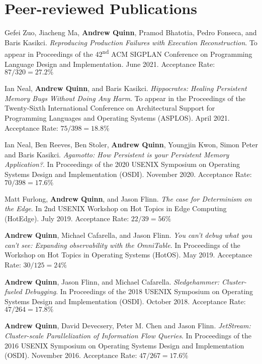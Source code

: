 \documentclass[letterpaper,10pt]{article}
\newcommand{\paper}[3]{#1. #2 #3}
\begin{document}
\section{Peer-reviewed Publications}
\begin{smenumerate}
  \item \paper{Gefei Zuo, Jiacheng Ma, \textbf{Andrew Quinn}, Pramod Bhatotia,
    Pedro Fonseca, and Baris Kasikci}{\emph{Reproducing Production Failures with
      Execution Reconstruction}. To appear in Proceedings of the
    42\textsuperscript{nd} ACM SIGPLAN Conference on Programming Language
    Design and Implementation. June 2021.}{Acceptance Rate: $87/320=27.2\%$}

  \item \paper{Ian Neal, \textbf{Andrew Quinn}, and Baris
    Kasikci}{\emph{Hippocrates: Healing Persistent Memory Bugs Without Doing Any
      Harm}. To appear in the Proceedings of the Twenty-Sixth International
    Conference on Architectural Support for Programming Languages and Operating
    Systems (ASPLOS). April 2021.}{Acceptance Rate: $75/398=18.8\%$}
    
\item \paper{Ian Neal, Ben Reeves, Ben Stoler, \textbf{Andrew Quinn}, Youngjin Kwon,
  Simon Peter and Baris Kasikci}{\emph{Agamotto: How Persistent is your
    Persistent Memory Application?}.  In Proceedings of the 2020 USENIX
  Symposium on Operating Systems Design and Implementation (OSDI).  November
  2020.}{Acceptance Rate: $70/398=17.6\%$}

\item \paper{Matt Furlong, \textbf{Andrew Quinn}, and Jason Flinn}
      {\emph{The case for Determinism on the Edge}.  In 2nd USENIX
        Workshop on Hot Topics in Edge Computing (HotEdge).  July
        2019.}{Acceptance Rate: $22/39=56\%$}

\item \paper{\textbf{Andrew Quinn}, Michael Cafarella, and Jason
  Flinn}{\emph{You can't debug what you can't see: Expanding
    observability with the OmniTable}. In Proceedings of the Workshop
  on Hot Topics in Operating Systems (HotOS).  May 2019.}{Acceptance
  Rate: $30/125=24\%$}

\item \paper{\textbf{Andrew Quinn}, Jason Flinn, and Michael Cafarella}{
  \emph{Sledgehammer: Cluster-fueled Debugging}.  In Proceedings of the 2018
  USENIX Symposium on Operating Systems Design and Implementation (OSDI).
  October 2018.}{Acceptance Rate: $47/264 = 17.8\%$}

\item \paper{\textbf{Andrew Quinn}, David Devecsery, Peter M. Chen and Jason
  Flinn}{\emph{JetStream: Cluster-scale Parallelization of Information
  Flow Queries}.  In Proceedings of the 2016 USENIX Symposium on
    Operating Systems Design and Implementation (OSDI). November
  2016.}{Acceptance Rate: $47/267=17.6\%$}
\end{smenumerate}
\end{document}
